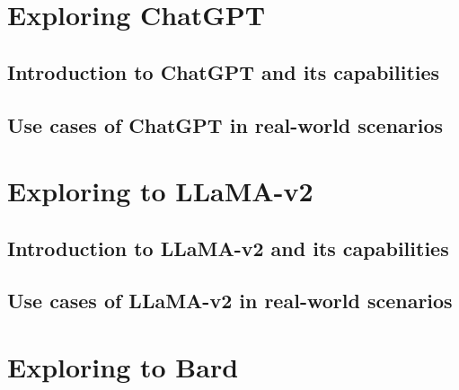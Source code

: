 \documentclass[
]{book}
\begin{document}
\hypertarget{exploring-chatgpt}{%
\chapter*{Exploring ChatGPT}\label{exploring-chatgpt}}

\hypertarget{introduction-to-chatgpt-and-its-capabilities}{%
\section*{Introduction to ChatGPT and its capabilities}\label{introduction-to-chatgpt-and-its-capabilities}}

\hypertarget{use-cases-of-chatgpt-in-real-world-scenarios}{%
\section*{Use cases of ChatGPT in real-world scenarios}\label{use-cases-of-chatgpt-in-real-world-scenarios}}

\hypertarget{exploring-to-llama-v2}{%
\chapter*{Exploring to LLaMA-v2}\label{exploring-to-llama-v2}}

\hypertarget{introduction-to-llama-v2-and-its-capabilities}{%
\section*{Introduction to LLaMA-v2 and its capabilities}\label{introduction-to-llama-v2-and-its-capabilities}}

\hypertarget{use-cases-of-llama-v2-in-real-world-scenarios}{%
\section*{Use cases of LLaMA-v2 in real-world scenarios}\label{use-cases-of-llama-v2-in-real-world-scenarios}}

\hypertarget{exploring-to-bard}{%
\chapter*{Exploring to Bard}\label{exploring-to-bard}}
\end{document}
